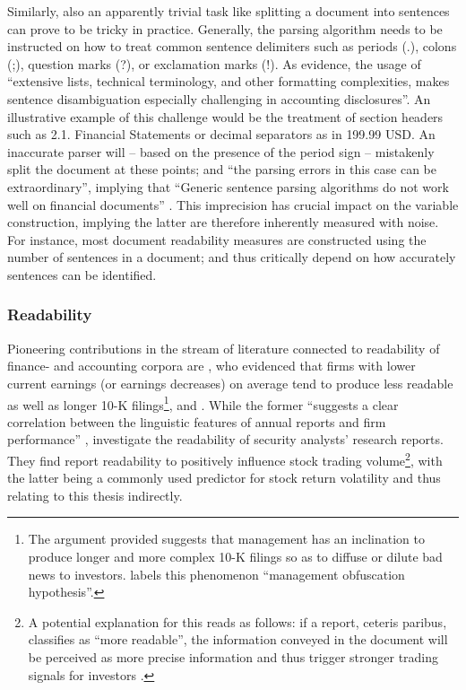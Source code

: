 Similarly, also an apparently trivial task like splitting a document into sentences can prove to be tricky in practice. Generally, the parsing algorithm needs to be instructed on how to treat common sentence delimiters such as periods (\textsf{.}), colons (\textsf{;}), question marks (\textsf{?}), or exclamation marks (\textsf{!}). As \textcite[1216]{LM-meta-2016} evidence, the usage of \enquote{extensive lists, technical terminology, and other formatting complexities, makes sentence disambiguation especially challenging in accounting disclosures}. An illustrative example of this challenge would be the treatment of section headers such as \textsf{2.1. Financial Statements} or decimal separators as in \textsf{199.99 USD}. An inaccurate parser will -- based on the presence of the period sign -- mistakenly split the document at these points; and \enquote{the parsing errors in this case can be extraordinary}, implying that \enquote{Generic sentence parsing algorithms do not work well on financial documents} \parencite[1216, 1217]{LM-meta-2016}. This imprecision has crucial impact on the variable construction, implying the latter are therefore inherently measured with noise. For instance, most document readability measures are constructed using the number of sentences in a document; and thus critically depend on how accurately sentences can be identified.

\subsubsection{Readability}
\label{sssec: lit_rev_mining_readability}
Pioneering contributions in the stream of literature connected to readability of finance- and accounting corpora are \textcite{Li2008}, who evidenced that firms with lower current earnings (or earnings decreases) on average tend to produce less readable as well as longer 10-K filings\footnote{The argument provided suggests that management has an inclination to produce longer and more complex 10-K filings so as to diffuse or dilute bad news to investors. \textcite[221]{Li2008} labels this phenomenon \enquote{management obfuscation hypothesis}.}, and \textcite{DeFranco2015}. While the former \enquote{suggests a clear correlation between the linguistic features of annual reports and firm performance} \parencite[222]{Li2008}, \textcite{DeFranco2015} investigate the readability of security analysts' research reports. They find report readability to positively influence stock trading volume\footnote{A potential explanation for this reads as follows: if a report, ceteris paribus, classifies as \enquote{more readable}, the information conveyed in the document will be perceived as more precise information and thus trigger stronger trading signals for investors \parencite{DeFranco2015}.}, with the latter being a commonly used predictor for stock return volatility and thus relating to this thesis indirectly.

